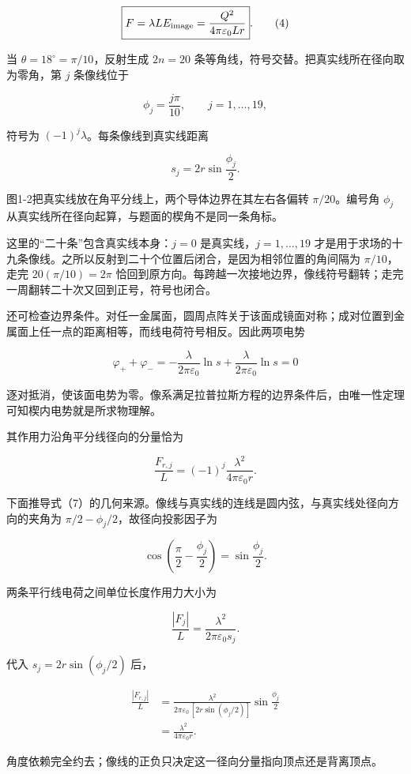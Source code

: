 \documentclass[12pt,a4paper,UTF8]{ctexart}
\begin{document}
\[
\boxed{
F=\lambda L E_{\rm image}
=\frac{Q^2}{4\pi\varepsilon_0Lr}
}.
\tag{4}
\]

当 \(\theta=18^\circ=\pi/10\)，反射生成 \(2n=20\)
条等角线，符号交替。把真实线所在径向取为零角，第 \(j\) 条像线位于

\[
\phi_j=\frac{j\pi}{10},
\qquad
j=1,\ldots,19,
\tag{5}
\]

符号为 \((-1)^j\lambda\)。每条像线到真实线距离

\[
s_j=2r\sin\frac{\phi_j}{2}.
\tag{6}
\]

图1-2把真实线放在角平分线上，两个导体边界在其左右各偏转
\(\pi/20\)。编号角 \(\phi_j\)
从真实线所在径向起算，与题面的楔角不是同一条角标。

这里的``二十条''包含真实线本身：\(j=0\) 是真实线，\(j=1,\ldots,19\)
才是用于求场的十九条像线。之所以反射到二十个位置后闭合，是因为相邻位置的角间隔为
\(\pi/10\)，走完 \(20(\pi/10)=2\pi\)
恰回到原方向。每跨越一次接地边界，像线符号翻转；走完一周翻转二十次又回到正号，符号也闭合。

还可检查边界条件。对任一金属面，圆周点阵关于该面成镜面对称；成对位置到金属面上任一点的距离相等，而线电荷符号相反。因此两项电势

\[
\varphi_++\varphi_-
=-\frac{\lambda}{2\pi\varepsilon_0}\ln s
+\frac{\lambda}{2\pi\varepsilon_0}\ln s=0
\]

逐对抵消，使该面电势为零。像系满足拉普拉斯方程的边界条件后，由唯一性定理可知楔内电势就是所求物理解。

其作用力沿角平分线径向的分量恰为

\[
\frac{F_{r,j}}L
=(-1)^j\frac{\lambda^2}{4\pi\varepsilon_0r}.
\tag{7}
\]

下面推导式（7）的几何来源。像线与真实线的连线是圆内弦，与真实线处径向方向的夹角为
\(\pi/2-\phi_j/2\)，故径向投影因子为

\[
\cos\left(\frac\pi2-\frac{\phi_j}{2}\right)
=\sin\frac{\phi_j}{2}.
\]

两条平行线电荷之间单位长度作用力大小为

\[
\frac{|F_j|}{L}
=\frac{\lambda^2}{2\pi\varepsilon_0s_j}.
\]

代入 \(s_j=2r\sin(\phi_j/2)\) 后，

\[
\begin{aligned}
\frac{|F_{r,j}|}{L}
&=\frac{\lambda^2}{2\pi\varepsilon_0
\,[2r\sin(\phi_j/2)]}
\sin\frac{\phi_j}{2}\\
&=\frac{\lambda^2}{4\pi\varepsilon_0r}.
\end{aligned}
\]

角度依赖完全约去；像线的正负只决定这一径向分量指向顶点还是背离顶点。
\end{document}
